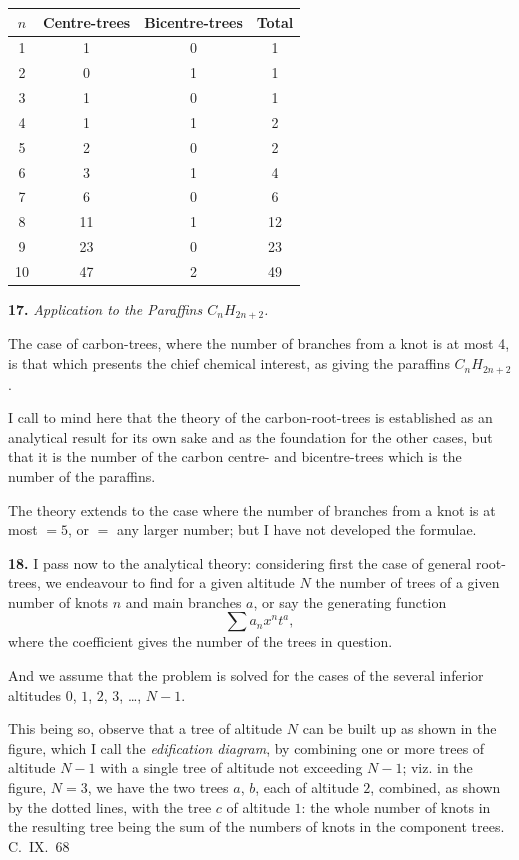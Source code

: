 \documentclass[11pt,a4paper]{book}
\begin{document}
{\begin{center}
\begin{tabular}{|c|c|c|c|}
\hline
$n$ & Centre-trees & Bicentre-trees & Total \\
\hline
1 & 1 & 0 & 1 \\
2 & 0 & 1 & 1 \\
3 & 1 & 0 & 1 \\
4 & 1 & 1 & 2 \\
5 & 2 & 0 & 2 \\
6 & 3 & 1 & 4 \\
7 & 6 & 0 & 6 \\
8 & 11 & 1 & 12 \\
9 & 23 & 0 & 23 \\
10 & 47 & 2 & 49 \\
\hline
\end{tabular}
\end{center}

\medskip
\noindent\textbf{17.}
\textit{Application to the Paraffins $C_nH_{2n+2}$.}

The case of carbon-trees, where the number of branches from a knot is at most 4, is that which presents the chief chemical interest, as giving the paraffins $C_nH_{2n+2}$.

I call to mind here that the theory of the carbon-root-trees is established as an analytical result for its own sake and as the foundation for the other cases, but that it is the number of the carbon centre- and bicentre-trees which is the number of the paraffins.

The theory extends to the case where the number of branches from a knot is at most $=5$, or $=$ any larger number; but I have not developed the formulae.

\medskip
\noindent\textbf{18.}
I pass now to the analytical theory: considering first the case of general root-trees, we endeavour to find for a given altitude $N$ the number of trees of a given number of knots $n$ and main branches $a$, or say the generating function
\[
\sum a_n x^n t^a,
\]
where the coefficient gives the number of the trees in question.

And we assume that the problem is solved for the cases of the several inferior altitudes $0$, $1$, $2$, $3$, \ldots, $N-1$.

This being so, observe that a tree of altitude $N$ can be built up as shown in the figure, which I call the \textit{edification diagram}, by combining one or more trees of altitude $N-1$ with a single tree of altitude not exceeding $N-1$; viz. in the figure, $N = 3$, we have the two trees $a$, $b$, each of altitude $2$, combined, as shown by the dotted lines, with the tree $c$ of altitude $1$: the whole number of knots in the resulting tree being the sum of the numbers of knots in the component trees.
\hfill C.~IX.\ 68

}
\end{document}
